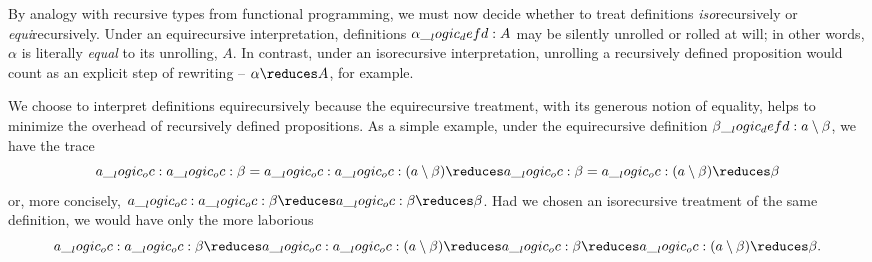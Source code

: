 By analogy with recursive types from functional programming\autocite{??}, we must now decide whether to treat definitions \emph{iso}\-re\-cur\-sively or \emph{equi}\-re\-cur\-sively.
Under an equirecursive interpretation, definitions $\alpha \__logic_defd: A$ may be silently unrolled or rolled at will;
in other words, $\alpha$ is literally \emph{equal} to its unrolling, $A$.
In contrast, under an isorecursive interpretation, unrolling a recursively defined proposition would count as an explicit step of rewriting -- $\alpha \reduces A$, for example.


We choose to interpret definitions equirecursively
because the equirecursive treatment, with its generous notion of equality, helps to minimize the overhead of recursively defined propositions.
As a simple example, under the equirecursive definition $\beta \__logic_defd: a \mathbin { \setminus } \beta$, we have the trace
\begin{equation*}
  a \oc a \oc \beta = a \oc a \oc (a \limp \beta) \reduces a \oc \beta = a \oc (a \limp \beta) \reduces \beta
\end{equation*}
or, more concisely, $a \oc a \oc \beta \reduces a \oc \beta \reduces \beta$.
Had we chosen
 an isorecursive treatment of the same definition, we would have only the more laborious
\begin{equation*}
  a \oc a \oc \beta \reduces a \oc a \oc (a \limp \beta) \reduces a \oc \beta \reduces a \oc (a \limp \beta) \reduces \beta
  .
\end{equation*}

